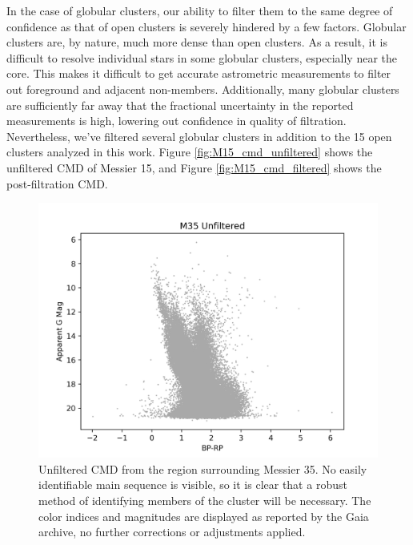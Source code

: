\documentclass[onecolumn,table,xcdraw,super]{aastex631}
\begin{document}
In the case of globular clusters, our ability to filter them to the same degree of confidence as that of open clusters is severely hindered by a few factors. Globular clusters are, by nature, much more dense than open clusters. As a result, it is difficult to resolve individual stars in some globular clusters, especially near the core. This makes it difficult to get accurate astrometric measurements to filter out foreground and adjacent non-members. Additionally, many globular clusters are sufficiently far away that the fractional uncertainty in the reported measurements is high, lowering out confidence in quality of filtration. Nevertheless, we've filtered several globular clusters in addition to the 15 open clusters analyzed in this work.  Figure \ref{fig:M15_cmd_unfiltered} shows the unfiltered CMD of Messier 15, and Figure \ref{fig:M15_cmd_filtered} shows the post-filtration CMD.

\begin{figure}[]
    \centering
      \includegraphics[width=4.75in]{figures/M35_cmd_unfiltered.png}
    \caption{Unfiltered CMD from the region surrounding Messier 35. No easily identifiable main sequence is visible, so it is clear that a robust method of identifying members of the cluster will be necessary. The color indices and magnitudes are displayed as reported by the Gaia archive, no further corrections or adjustments applied.}
    \label{fig:M35_cmd_unfiltered}
\end{figure}
\end{document}
